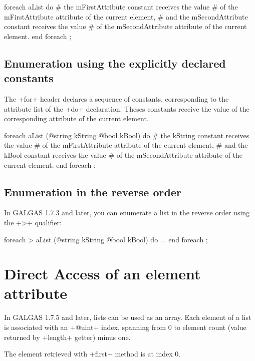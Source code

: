 \begin{galgas}
foreach aList do
  # the mFirstAttribute constant receives the value
  # of the mFirstAttribute attribute of the current element,
  # and the mSecondAttribute constant receives the value
  # of the mSecondAttribute attribute of the current element.
end foreach ;
\end{galgas}

\subsection{Enumeration using the explicitly declared constants}

The \ggs+for+ header declares a sequence of constants, corresponding to the attribute list of the \ggs+do+ declaration. Theses constants receive the value of the corresponding attribute of the current element.


\begin{galgas}
foreach aList (@string kString @bool kBool) do
  # the kString constant receives the value
  # of the mFirstAttribute attribute of the current element,
  # and the kBool constant receives the value
  # of the mSecondAttribute attribute of the current element.
end foreach ;
\end{galgas}

\subsection{Enumeration in the reverse order}

In GALGAS 1.7.3 and later, you can enumerate a list in the reverse order using the \ggs+>+ qualifier:

\begin{galgas}
foreach > aList (@string kString @bool kBool) do
  ...
end foreach ;
\end{galgas}




\section{Direct Access of an element attribute}

In GALGAS 1.7.5 and later, lists can be used as an array. Each element of a list is associated with an \ggs+@uint+ index, spanning from 0 to element count (value returned by \ggs+length+ getter) minus one.

The element retrieved with \ggs+first+ method is at index 0.

